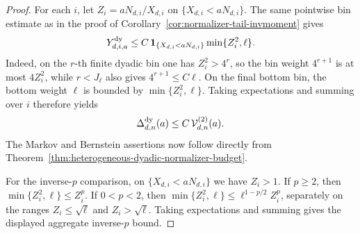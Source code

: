 \documentclass[11pt]{amsart}
\numberwithin{equation}{section}
\theoremstyle{definition}
\theoremstyle{remark}
\begin{document}
\begin{proof}
For each \(i\), let \(Z_i=aN_{d,i}/X_{d,i}\) on
\(\{X_{d,i}<aN_{d,i}\}\).  The same pointwise bin estimate as in the proof of
Corollary~\ref{cor:normalizer-tail-invmoment} gives
\[
  Y_{d,i,a}^{\rm dy}
  \le
  C\,\mathbf 1_{\{X_{d,i}<aN_{d,i}\}}\min\{Z_i^2,\ell\}.
\]
Indeed, on the \(r\)-th finite dyadic bin one has \(Z_i^2>4^r\), so the bin
weight \(4^{r+1}\) is at most \(4Z_i^2\), while \(r<J_\ell\) also gives
\(4^{r+1}\le C\ell\).  On the final bottom bin, the bottom weight \(\ell\) is
bounded by \(\min\{Z_i^2,\ell\}\).  Taking expectations and summing over \(i\)
therefore yields
\[
  \Delta_{d,n}^{\rm dy}(a)
  \le C\,\mathcal V_{d,n}^{(2)}(a).
\]
The Markov and Bernstein assertions now follow directly from
Theorem~\ref{thm:heterogeneous-dyadic-normalizer-budget}.

For the inverse-\(p\) comparison, on \(\{X_{d,i}<aN_{d,i}\}\) we have \(Z_i>1\).
If \(p\ge2\), then \(\min\{Z_i^2,\ell\}\le Z_i^p\).  If \(0<p<2\), then
\(\min\{Z_i^2,\ell\}\le \ell^{1-p/2}Z_i^p\), separately on the ranges
\(Z_i\le\sqrt\ell\) and \(Z_i>\sqrt\ell\).  Taking expectations and summing
gives the displayed aggregate inverse-\(p\) bound.
\end{proof}
\end{document}
